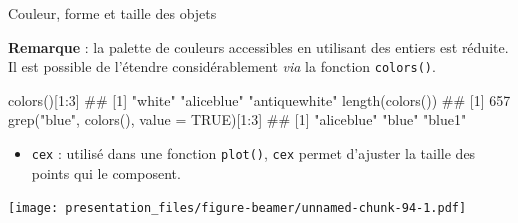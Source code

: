 \documentclass[12pt,ignorenonframetext,handout,]{beamer}
\newenvironment{Shaded}{}{}
\newcommand{\DataTypeTok}[1]{#1}
\newcommand{\DecValTok}[1]{#1}
\newcommand{\KeywordTok}[1]{\textcolor[rgb]{0.00,0.00,1.00}{#1}}
\newcommand{\NormalTok}[1]{#1}
\newcommand{\OperatorTok}[1]{#1}
\newcommand{\OtherTok}[1]{\textcolor[rgb]{1.00,0.25,0.00}{#1}}
\newcommand{\StringTok}[1]{\textcolor[rgb]{0.00,0.50,0.50}{#1}}
\providecommand{\tightlist}{%
  \setlength{\itemsep}{0pt}\setlength{\parskip}{0pt}}
\renewenvironment{Shaded}{\begin{snugshade}}{\end{snugshade}}
\newcommand{\intertitre}[1]{\textcolor{redInsee}{\textbf{#1}}}
\begin{document}
\begin{frame}[fragile]{Couleur, forme et taille des objets}
\protect\hypertarget{couleur-forme-et-taille-des-objets-1}{}

\intertitre{Remarque} : la palette de couleurs accessibles en utilisant
des entiers est réduite. Il est possible de l’étendre considérablement
\emph{via} la fonction \texttt{colors()}.

\small

\begin{Shaded}
\begin{Highlighting}[]
\KeywordTok{colors}\NormalTok{()[}\DecValTok{1}\OperatorTok{:}\DecValTok{3}\NormalTok{]}
\NormalTok{  ## [1] "white"        "aliceblue"    "antiquewhite"}
\KeywordTok{length}\NormalTok{(}\KeywordTok{colors}\NormalTok{())}
\NormalTok{  ## [1] 657}
\KeywordTok{grep}\NormalTok{(}\StringTok{"blue"}\NormalTok{, }\KeywordTok{colors}\NormalTok{(), }\DataTypeTok{value =} \OtherTok{TRUE}\NormalTok{)[}\DecValTok{1}\OperatorTok{:}\DecValTok{3}\NormalTok{]}
\NormalTok{  ## [1] "aliceblue" "blue"      "blue1"}
\end{Highlighting}
\end{Shaded}

\pause \normalsize

\begin{itemize}
\tightlist
\item
  \texttt{cex} : utilisé dans une fonction \texttt{plot()}, \texttt{cex}
  permet d’ajuster la taille des points qui le composent.
\end{itemize}

\texttt{[image: presentation\_files/figure-beamer/unnamed-chunk-94-1.pdf]}

\end{frame}
\end{document}
